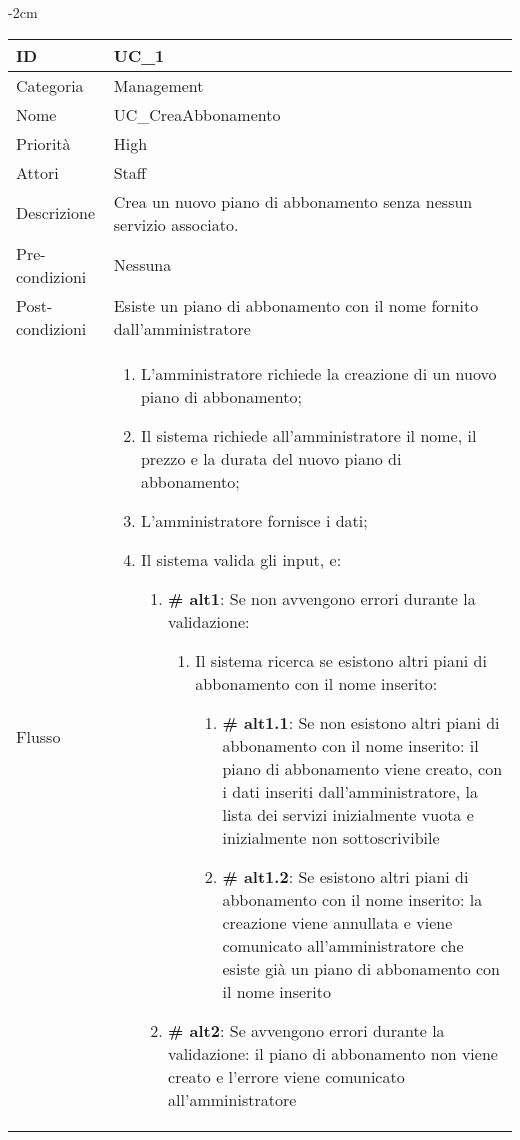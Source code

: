 \begin{center}

\begin{table}[bp]
    \centering
    \addtolength{\leftskip} {-2cm}
\begin{tabular}{ |p{2.6cm}|p{13cm}|  }
\hline
ID & UC\_1 \\\hline
Categoria & Management\\\hline
Nome & UC\_CreaAbbonamento\\\hline
Priorità & High \\\hline
Attori &  Staff \\\hline
Descrizione & Crea un nuovo piano di abbonamento senza nessun servizio associato.\\\hline
Pre-condizioni &  Nessuna\\\hline
Post-condizioni &  Esiste un piano di abbonamento con il nome fornito dall'amministratore\\\hline
Flusso &  	\begin{enumerate}
			\item L'amministratore richiede la creazione di un nuovo piano di abbonamento;
			\item Il sistema richiede all'amministratore il nome, il prezzo e la durata del nuovo piano di abbonamento;
			\item L'amministratore fornisce i dati;
			\item Il sistema valida gli input, e:
				\begin{enumerate}[  ]
				\item \textbf{\# alt1}: Se non avvengono errori durante la validazione:
					\begin{enumerate}[label*=\arabic*.]
					\item Il sistema ricerca se esistono altri piani di abbonamento con il nome inserito:
						\begin{enumerate}[label*=\arabic*.]
						\item \textbf{\# alt1.1}: Se non esistono altri piani di abbonamento con il nome inserito: il piano di abbonamento viene creato, con i dati inseriti dall'amministratore, la lista dei servizi inizialmente vuota e inizialmente non sottoscrivibile
						\item \textbf{\# alt1.2}: Se esistono altri piani di abbonamento con il nome inserito: la creazione viene annullata e viene comunicato all'amministratore che esiste già un piano di abbonamento con il nome inserito	
						\end{enumerate}
					\end{enumerate}
				\item \textbf{\# alt2}: Se avvengono errori durante la validazione: il piano di abbonamento non viene creato e l'errore viene comunicato all'amministratore
				\end{enumerate}
			

\end{enumerate}
\end{tabular}
\end{table}
\end{center}
